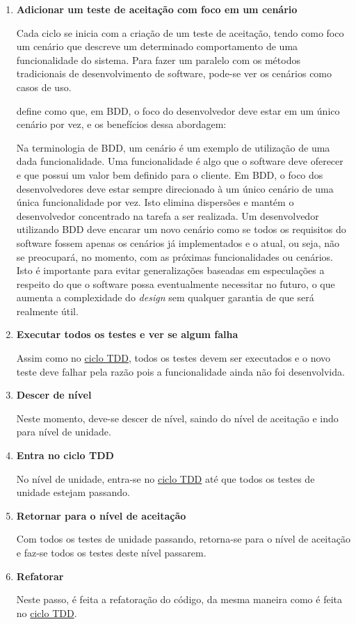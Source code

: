 \begin{enumerate}
\item \textbf{Adicionar um teste de aceitação com foco em um cenário}

Cada ciclo se inicia com a criação de um teste de aceitação, tendo como foco um cenário que descreve um determinado comportamento de uma funcionalidade do sistema. Para fazer um paralelo com os métodos tradicionais de desenvolvimento de software, pode-se ver os cenários como casos de uso.

 define como que, em BDD, o foco do desenvolvedor deve estar em um único cenário por vez, e os benefícios dessa abordagem:

\begin{citacao}
Na terminologia de BDD, um cenário é um exemplo de utilização de uma dada funcionalidade. Uma funcionalidade é algo que o software deve oferecer e que possui um valor bem definido para o cliente. Em BDD, o foco dos desenvolvedores deve estar sempre direcionado à um único cenário de uma única funcionalidade por vez. Isto elimina dispersões e mantém o desenvolvedor concentrado na tarefa a ser realizada. Um desenvolvedor utilizando BDD deve encarar um novo cenário como se todos os requisitos do software fossem apenas os cenários já implementados e o atual, ou seja, não se preocupará, no momento, com as próximas funcionalidades ou cenários. Isto é importante para evitar generalizações baseadas em especulações a respeito do que o software possa eventualmente necessitar no futuro, o que aumenta a complexidade do \textit{design} sem qualquer garantia de que será realmente útil.
\end{citacao}

\item \textbf{Executar todos os testes e ver se algum falha}

Assim como no \hyperref[ssub:ciclo_tdd]{ciclo TDD}, todos os testes devem ser executados e o novo teste deve falhar pela razão pois a funcionalidade ainda não foi desenvolvida.

\item \textbf{Descer de nível}

Neste momento, deve-se descer de nível, saindo do nível de aceitação e indo para nível de unidade.

\item \textbf{Entra no ciclo TDD}

No nível de unidade, entra-se no \hyperref[ssub:ciclo_tdd]{ciclo TDD} até que todos os testes de unidade estejam passando.

\item \textbf{Retornar para o nível de aceitação}

Com todos os testes de unidade passando, retorna-se para o nível de aceitação e faz-se todos os testes deste nível passarem.

\item \textbf{Refatorar}

Neste passo, é feita a refatoração do código, da mesma maneira como é feita no \hyperref[ssub:ciclo_tdd]{ciclo TDD}.

\end{enumerate}

